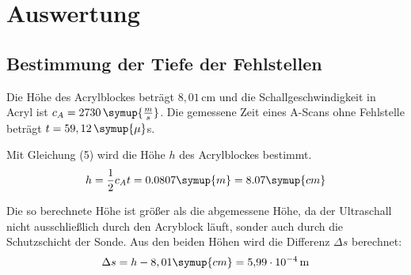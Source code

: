 \section{Auswertung}
\label{sec:Auswertung}

\subsection{Bestimmung  der Tiefe der Fehlstellen}

Die Höhe des Acrylblockes beträgt $8,01\,$cm und die Schallgeschwindigkeit in Acryl ist $c_A=2730 \, \symup{\frac{m}{s}}$.
Die gemessene Zeit eines A-Scans ohne Fehlstelle beträgt $t =59,12\, \symup{\mu}$s.

Mit Gleichung (5) wird die Höhe $h$ des Acrylblockes bestimmt.
\begin{align*}
  h = \frac{1}{2} c_A t = 0.0807 \symup{m} = 8.07  \symup{cm}
\end{align*}

Die so berechnete Höhe ist größer als die abgemessene Höhe, da der Ultraschall nicht ausschließlich durch den Acryblock läuft, sonder auch durch die
Schutzschicht der Sonde. Aus den beiden Höhen wird die Differenz $\Delta s$ berechnet:
\begin{align*}
  \Delta s = h - 8,01 \symup{cm} = \SI{5.99e-4}{\meter}
\end{align*}


